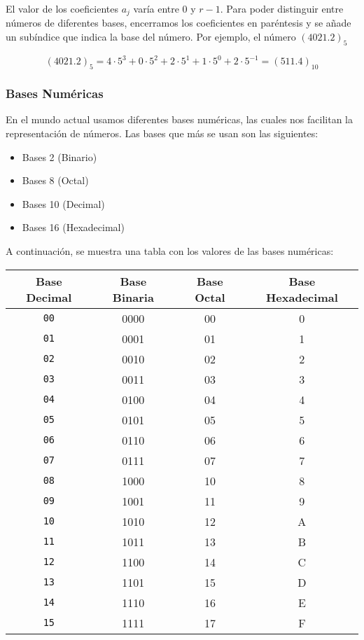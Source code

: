 El valor de los coeficientes $a_j$ varía entre 0 y $r-1$. Para poder distinguir entre números de diferentes bases, 
encerramos los coeficientes en paréntesis y se añade un subíndice que indica la base del número. 
Por ejemplo, el número $(4021.2)_5$

\begin{equation}
    (4021.2)_5 = 4 \cdot 5^3 + 0 \cdot 5^2 + 2 \cdot 5^1 + 1 \cdot 5^0 + 2 \cdot 5^{-1} = (511.4)_{10}
\end{equation}

\subsubsection{Bases Numéricas}

En el mundo actual usamos diferentes bases numéricas, las cuales nos facilitan la representación de números. 
Las bases que más se usan son las siguientes:

\begin{itemize}
    \item Bases 2 (Binario)
    \item Bases 8 (Octal)
    \item Bases 10 (Decimal)
    \item Bases 16 (Hexadecimal)
\end{itemize}

A continuación, se muestra una tabla con los valores de las bases numéricas:

\begin{table}[h]
    \centering
    \setlength{\tabcolsep}{12pt}
    \renewcommand{\arraystretch}{1.2}
    \begin{tabular}{|c|c|c|c|}
        \hline
        \textbf{Base Decimal} & \textbf{Base Binaria} & \textbf{Base Octal} & \textbf{Base Hexadecimal} \\
        \hline
        \texttt{00} & 0000 & 00 & 0 \\
        \texttt{01} & 0001 & 01 & 1 \\
        \texttt{02} & 0010 & 02 & 2 \\
        \texttt{03} & 0011 & 03 & 3 \\
        \texttt{04} & 0100 & 04 & 4 \\
        \texttt{05} & 0101 & 05 & 5 \\
        \texttt{06} & 0110 & 06 & 6 \\
        \texttt{07} & 0111 & 07 & 7 \\
        \texttt{08} & 1000 & 10 & 8 \\
        \texttt{09} & 1001 & 11 & 9 \\
        \texttt{10} & 1010 & 12 & A \\
        \texttt{11} & 1011 & 13 & B \\
        \texttt{12} & 1100 & 14 & C \\
        \texttt{13} & 1101 & 15 & D \\
        \texttt{14} & 1110 & 16 & E \\
        \texttt{15} & 1111 & 17 & F \\
        \hline
    \end{tabular}
\end{table}

